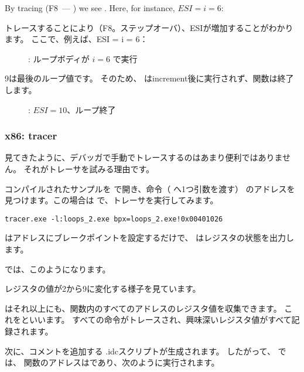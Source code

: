 By tracing (F8~--- \stepover) we see \ESI 
{}.
Here, for instance, $ESI=i=6$:

トレースすることにより（F8。ステップオーバ）、ESIが増加することがわかります。 ここで、例えば、ESI = i = 6：

\begin{figure}[H]
\centering
{}
\caption{\olly: ループボディが $i=6$ で実行}
\label{fig:loops_olly_2}
\end{figure}

9は最後のループ値です。
そのため、 \JL は\gls{increment}後に実行されず、関数は終了します。

\begin{figure}[H]
\centering
{}
\caption{\olly: $ESI=10$、ループ終了}
\label{fig:loops_olly_3}
\end{figure}

\subsubsection{x86: tracer}

見てきたように、デバッガで手動でトレースするのはあまり便利ではありません。 
それがトレーサを試みる理由です。

コンパイルされたサンプルを \IDA で開き、命令（ \ttf へ1つ引数を渡す）
のアドレスを見つけます。この場合は  で、トレーサを実行してみます。

\begin{lstlisting}
tracer.exe -l:loops_2.exe bpx=loops_2.exe!0x00401026
\end{lstlisting}

 はアドレスにブレークポイントを設定するだけで、 \tracer はレジスタの状態を出力します。

では、このようになります。



\ESI レジスタの値が2から9に変化する様子を見ています。

\tracer はそれ以上にも、関数内のすべてのアドレスのレジスタ値を収集できます。 
これをといいます。 
すべての命令がトレースされ、興味深いレジスタ値がすべて記録されます。

次に、コメントを追加する \IDA .idcスクリプトが生成されます。 
したがって、 \IDA では、 \main 関数のアドレスはであり、次のように実行されます。

